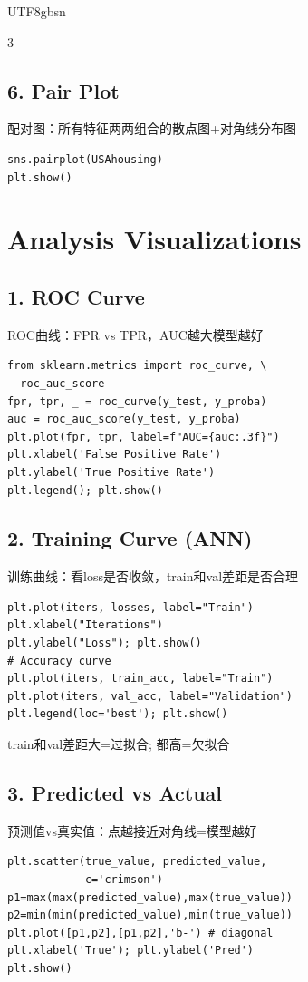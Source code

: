 \documentclass[9pt,landscape,a4paper]{article}
\newcommand{\zhint}[1]{{\scriptsize\color{gray!70!black}#1}}
\begin{document}
\begin{CJK}{UTF8}{gbsn}
\begin{multicols}{3}
\subsection{6. Pair Plot}
\zhint{配对图：所有特征两两组合的散点图+对角线分布图}
\begin{lstlisting}
sns.pairplot(USAhousing)
plt.show()
\end{lstlisting}

\section{Analysis Visualizations}

\subsection{1. ROC Curve}
\zhint{ROC曲线：FPR vs TPR，AUC越大模型越好}
\begin{lstlisting}
from sklearn.metrics import roc_curve, \
  roc_auc_score
fpr, tpr, _ = roc_curve(y_test, y_proba)
auc = roc_auc_score(y_test, y_proba)
plt.plot(fpr, tpr, label=f"AUC={auc:.3f}")
plt.xlabel('False Positive Rate')
plt.ylabel('True Positive Rate')
plt.legend(); plt.show()
\end{lstlisting}

\subsection{2. Training Curve (ANN)}
\zhint{训练曲线：看loss是否收敛，train和val差距是否合理}
\begin{lstlisting}
plt.plot(iters, losses, label="Train")
plt.xlabel("Iterations")
plt.ylabel("Loss"); plt.show()
# Accuracy curve
plt.plot(iters, train_acc, label="Train")
plt.plot(iters, val_acc, label="Validation")
plt.legend(loc='best'); plt.show()
\end{lstlisting}
\zhint{train和val差距大=过拟合; 都高=欠拟合}

\subsection{3. Predicted vs Actual}
\zhint{预测值vs真实值：点越接近对角线=模型越好}
\begin{lstlisting}
plt.scatter(true_value, predicted_value,
            c='crimson')
p1=max(max(predicted_value),max(true_value))
p2=min(min(predicted_value),min(true_value))
plt.plot([p1,p2],[p1,p2],'b-') # diagonal
plt.xlabel('True'); plt.ylabel('Pred')
plt.show()
\end{lstlisting}


\end{multicols}
\end{CJK}
\end{document}
